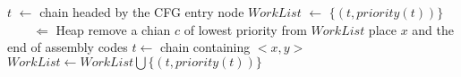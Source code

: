 
\begin{algorithmic}
    \State $t$ $\gets$ chain headed by the CFG entry node
    \State $WorkList$ $\gets$ $\lbrace(t, priority(t))\rbrace$ $ \qquad \Leftarrow$ Heap\cite{forsythe1964algorithms}
    \State remove a chian $c$ of lowest priority from $WorkList$
    \State place $x$ and the end of assembly codes
    \EndFor
    \State $t \gets $ chain containing $<x, y>$
    $WorkList \gets WorkList \bigcup \lbrace (t, priority(t)) \rbrace$
    \EndIf
    \EndFor
    \EndFor
    \EndWhile
\end{algorithmic}
